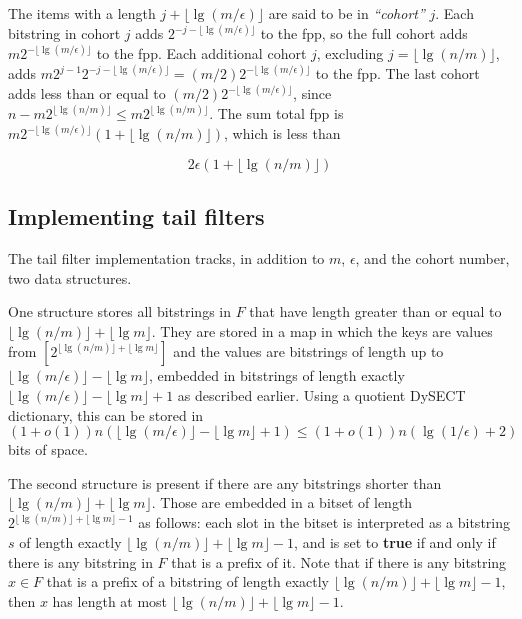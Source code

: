 \documentclass[11pt,letterpaper]{article}
\begin{document}
The items with a length $j + \lfloor \lg (m / \epsilon) \rfloor$ are said to be in {\em ``cohort''} $j$.
Each bitstring in cohort $j$ adds $2^{- j - \lfloor \lg (m / \epsilon) \rfloor}$ to the fpp, so the full cohort adds $m2^{- \lfloor \lg (m / \epsilon) \rfloor}$ to the fpp.
Each additional cohort $j$, excluding $j = \lfloor \lg (n/m) \rfloor$, adds $m 2^{j-1} 2^{-j - \lfloor \lg (m / \epsilon) \rfloor} = (m/2) 2^{-\lfloor \lg (m / \epsilon) \rfloor}$ to the fpp.
The last cohort adds less than or equal to $(m/2) 2^{-\lfloor \lg (m / \epsilon) \rfloor}$, since $n - m 2^{\lfloor \lg (n/m) \rfloor} \leq m 2^{\lfloor \lg(n/m)\rfloor}$.
The sum total fpp is $m 2^{- \lfloor \lg (m / \epsilon) \rfloor} (1 + \lfloor \lg (n/m) \rfloor)$, which is less than

\begin{equation}
  2 \epsilon (1 + \lfloor \lg (n/m) \rfloor)
\end{equation}

\subsection{Implementing tail filters}

The tail filter implementation tracks, in addition to $m$, $\epsilon$, and the cohort number, two data structures.

One structure stores all bitstrings in $F$ that have length greater than or equal to $\lfloor \lg (n/m) \rfloor + \lfloor \lg m \rfloor$.
They are stored in a map in which the keys are values from $[2^{\lfloor \lg (n/m) \rfloor + \lfloor \lg m \rfloor}]$ and the values are bitstrings of length up to $\lfloor \lg (m/\epsilon) \rfloor - \lfloor \lg m \rfloor$, embedded in bitstrings of length exactly $\lfloor \lg (m/\epsilon) \rfloor - \lfloor \lg m \rfloor + 1$ as described earlier.
Using a quotient DySECT dictionary, this can be stored in $(1 + o(1))n(\lfloor \lg (m/\epsilon) \rfloor - \lfloor \lg m \rfloor + 1) \leq (1+o(1))n(\lg (1/\epsilon) + 2)$ bits of space.

The second structure is present if there are any bitstrings shorter than $\lfloor \lg (n/m) \rfloor + \lfloor \lg m \rfloor$.
Those are embedded in a bitset of length $2^{\lfloor \lg (n/m) \rfloor + \lfloor \lg m \rfloor - 1}$ as follows:
each slot in the bitset is interpreted as a bitstring $s$ of length exactly $\lfloor \lg (n/m) \rfloor + \lfloor \lg m \rfloor - 1$, and is set to {\bf true} if and only if there is any bitstring in $F$ that is a prefix of it.
Note that if there is any bitstring $x \in F$ that is a prefix of a bitstring of length exactly $\lfloor \lg (n/m) \rfloor + \lfloor \lg m \rfloor - 1$, then $x$ has length at most $\lfloor \lg (n/m) \rfloor + \lfloor \lg m \rfloor - 1$.
\end{document}
